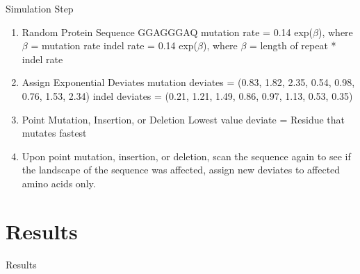 \documentclass{beamer}
\begin{document}
	\begin{frame}{Simulation Step}
		\begin{center}
			\begin{enumerate}
			\item Random Protein Sequence \newline	
			GGAGGGAQ \newline		
			mutation rate = 0.14
			\qquad exp($\beta$), where $\beta$ = mutation rate\newline 
			indel rate = 0.14 \qquad exp($\beta$), where $\beta$ = length of repeat * indel rate \newline \pause
			
			\item Assign Exponential Deviates \newline
			mutation deviates = (0.83, 1.82, 2.35, 0.54, 0.98, 0.76, 1.53, 2.34) \newline
			indel deviates = (0.21, 1.21, 1.49, 0.86, 0.97, 1.13, 0.53, 0.35) \newline \pause
			
			\item Point Mutation, Insertion, or Deletion \newline
			Lowest value deviate = Residue that mutates fastest \newline \pause
			
			\item Upon point mutation, insertion, or deletion, scan the sequence again to see if the landscape of the sequence was affected, assign new deviates to affected amino acids only.
			
			\end{enumerate}
		\end{center}
		
	
	\end{frame}

	\section{Results}
	\begin{frame}{Results}
		
		
	\end{frame}
\end{document}

